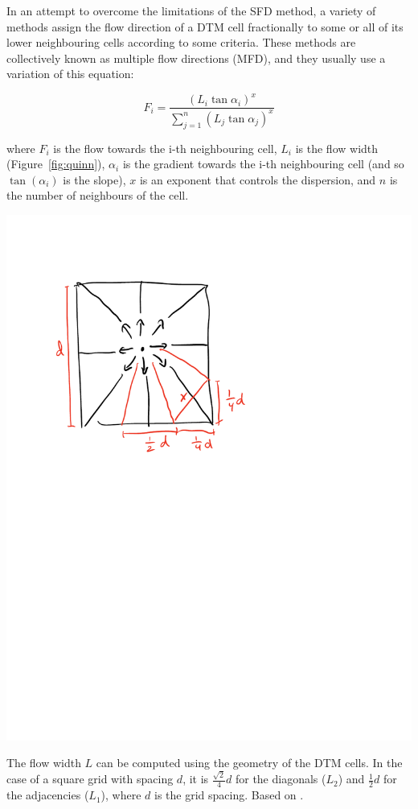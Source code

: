 In an attempt to overcome the limitations of the SFD method, a variety of methods assign the flow direction of a DTM cell fractionally to some or all of its lower neighbouring cells according to some criteria.
These methods are collectively known as multiple flow directions (MFD), 
and they usually use a variation of this equation:

\begin{equation}
F_i = \frac{\left(L_i \tan{\alpha_i}\right)^x}{\sum_{j=1}^{n}\left(L_j \tan{\alpha_j}\right)^x}
\end{equation}

where \(F_i\) is the flow towards the i-th neighbouring cell, \(L_i\) is the flow width (Figure~\ref{fig:quinn}), \(\alpha_i\) is the gradient towards the i-th neighbouring cell (and so \(\tan(\alpha_i)\) is the slope), \(x\) is an exponent that controls the dispersion, and \(n\) is the number of neighbours of the cell.

\begin{marginfigure}
\centering
\includegraphics[width=\linewidth]{figs/quinn.pdf}
\caption{The flow width \(L\) can be computed using the geometry of the DTM cells.
In the case of a square grid with spacing \(d\), it is \(\frac{\sqrt{2}}{4}d\) for the diagonals (\(L_2\)) and \(\frac{1}{2}d\) for the adjacencies (\(L_1\)), where \(d\) is the grid spacing. Based on \citet{Quinn91}.}%
\label{fig:quinn}
\end{marginfigure}

